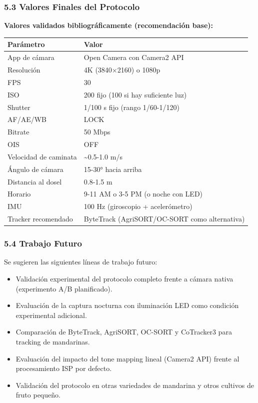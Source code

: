 \subsubsection{5.3 Valores Finales del Protocolo}


\textbf{Valores validados bibliográficamente (recomendación base):}



\begin{tabular}{ll}
\hline
Parámetro & Valor \\
\hline
App de cámara & Open Camera con Camera2 API \\
Resolución & 4K (3840×2160) o 1080p \\
FPS & 30 \\
ISO & 200 fijo (100 si hay suficiente luz) \\
Shutter & 1/100 s fijo (rango 1/60-1/120) \\
AF/AE/WB & LOCK \\
Bitrate & 50 Mbps \\
OIS & OFF \\
Velocidad de caminata & \textasciitilde{}0.5-1.0 m/s \\
Ángulo de cámara & 15-30° hacia arriba \\
Distancia al dosel & 0.8-1.5 m \\
Horario & 9-11 AM o 3-5 PM (o noche con LED) \\
IMU & 100 Hz (giroscopio + acelerómetro) \\
Tracker recomendado & ByteTrack (AgriSORT/OC-SORT como alternativa) \\
\hline
\end{tabular}


\subsubsection{5.4 Trabajo Futuro}


Se sugieren las siguientes líneas de trabajo futuro:

\begin{itemize}
\item Validación experimental del protocolo completo frente a cámara nativa (experimento A/B planificado).
\item Evaluación de la captura nocturna con iluminación LED como condición experimental adicional.
\item Comparación de ByteTrack, AgriSORT, OC-SORT y CoTracker3 para tracking de mandarinas.
\item Evaluación del impacto del tone mapping lineal (Camera2 API) frente al procesamiento ISP por defecto.
\item Validación del protocolo en otras variedades de mandarina y otros cultivos de fruto pequeño.
\end{itemize}

